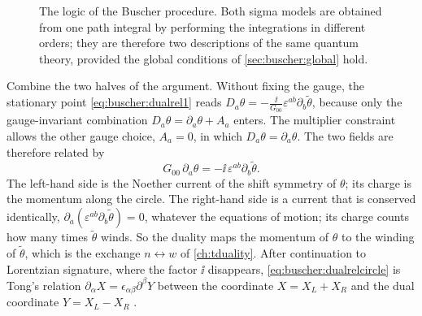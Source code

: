 \begin{figure}[t]
\centering
{}
\caption{The logic of the Buscher procedure. Both sigma models are obtained from one path
integral by performing the integrations in different orders; they are therefore two
descriptions of the same quantum theory, provided the global conditions of
\cref{sec:buscher:global} hold.}
\label{fig:buscher:logic}
\end{figure}

\begin{physicsbox}
Combine the two halves of the argument. Without fixing the gauge, the stationary point
\eqref{eq:buscher:dualrel1} reads $D_a\theta=-\frac{\ii}{G_{00}}\varepsilon^{ab}
\partial_b\tilde\theta$, because only the gauge-invariant combination
$D_a\theta=\partial_a\theta+A_a$ enters. The multiplier constraint allows the other gauge
choice, $A_a=0$, in which $D_a\theta=\partial_a\theta$. The two fields are therefore related
by
\begin{equation}\label{eq:buscher:dualrelcircle}
 G_{00}\,\partial_a\theta=-\ii\,\varepsilon^{ab}\partial_b\tilde\theta .
\end{equation}
The left-hand side is the Noether current of the shift symmetry of $\theta$; its charge is the
momentum along the circle. The right-hand side is a current that is conserved identically,
$\partial_a(\varepsilon^{ab}\partial_b\tilde\theta)=0$, whatever the equations of motion; its
charge counts how many times $\tilde\theta$ winds. So the duality maps the momentum of
$\theta$ to the winding of $\tilde\theta$, which is the exchange $n\leftrightarrow w$ of
\cref{ch:tduality}. After continuation to Lorentzian signature, where the factor $\ii$
disappears, \eqref{eq:buscher:dualrelcircle} is Tong's relation
$\partial_\alpha X=\epsilon_{\alpha\beta}\partial^\beta Y$ between the coordinate
$X=X_L+X_R$ and the dual coordinate $Y=X_L-X_R$ .
\end{physicsbox}

